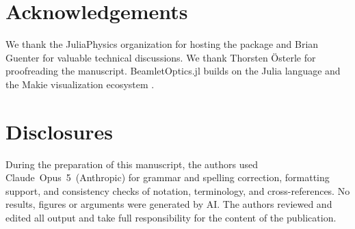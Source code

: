 \documentclass{juliacon}
\begin{document}
\section*{Acknowledgements}

We thank the JuliaPhysics organization for hosting the package and
Brian Guenter for valuable technical discussions. We thank Thorsten \"Osterle
for proofreading the manuscript. BeamletOptics.jl builds on the Julia language
\cite{bezanson2017julia} and the Makie visualization ecosystem
\cite{Danisch2021}.

\section*{Disclosures}

During the preparation of this manuscript, the authors used \mbox{Claude Opus 5
(Anthropic)} for grammar and spelling correction, formatting support,
and consistency checks of notation, terminology, and cross-references.
No results, figures or arguments were generated by AI. The authors
reviewed and edited all output and take full responsibility for the
content of the publication.


\end{document}
